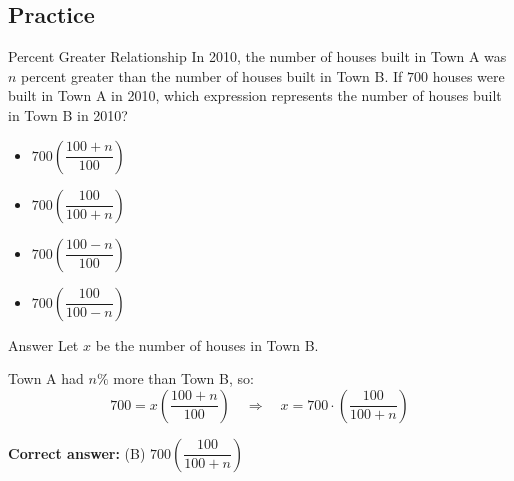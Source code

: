 \documentclass{beamer}
\begin{document}
\begin{frame}
\section{Practice}
\end{frame}


\begin{frame}{Percent Greater Relationship}
In 2010, the number of houses built in Town A was $n$ percent greater than the number of houses built in Town B. If $700$ houses were built in Town A in 2010, which expression represents the number of houses built in Town B in 2010?
\begin{itemize}
    \item[(A)] $700 \left( \dfrac{100 + n}{100} \right)$
    \item[(B)] $700 \left( \dfrac{100}{100 + n} \right)$
    \item[(C)] $700 \left( \dfrac{100 - n}{100} \right)$
    \item[(D)] $700 \left( \dfrac{100}{100 - n} \right)$
\end{itemize}
\end{frame}


\begin{frame}{Answer}
Let $x$ be the number of houses in Town B.

Town A had $n\%$ more than Town B, so:
\[
700 = x \left( \dfrac{100 + n}{100} \right)
\quad \Rightarrow \quad
x = 700 \cdot \left( \dfrac{100}{100 + n} \right)
\]

\textbf{Correct answer:} (B) $700 \left( \dfrac{100}{100 + n} \right)$
\end{frame}
\end{document}
